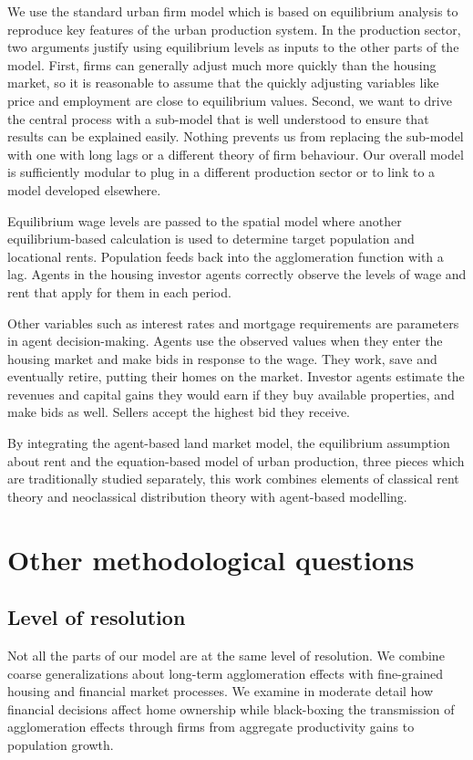 We use the standard urban firm model which is based on equilibrium analysis to reproduce key features of the urban production system. In the production sector, two arguments justify using equilibrium levels as inputs to the other parts of the model. First, firms can generally adjust much more quickly than the housing market, so it is reasonable to assume that the quickly adjusting variables like price and employment are close to equilibrium values.  Second, we want to drive the central process with a sub-model that is well understood to ensure that results can be explained easily. Nothing prevents us from replacing the sub-model with one with long lags or a different theory of firm behaviour. Our overall model is sufficiently modular to plug in a different production sector or to link to a model developed elsewhere.

Equilibrium wage levels are passed to the spatial model where another equilibrium-based calculation is used to determine target population and locational rents. Population feeds back into the agglomeration function with a lag. Agents in the housing investor agents correctly observe the levels of wage and rent that apply for them in each period. 

Other variables such as interest rates and mortgage requirements are parameters in agent decision-making. Agents use the observed values when they enter the housing market and make bids in response to the wage. They work, save and eventually retire, putting their homes on the market. Investor agents estimate the revenues and capital gains they would earn if they buy available properties, and make bids as well. Sellers accept the highest bid they receive. 

By integrating the agent-based land market model, the equilibrium assumption about rent and the equation-based model of urban production, three pieces which are traditionally studied separately, this work combines elements of classical rent theory and neoclassical distribution theory with agent-based modelling.



\section{Other methodological questions}\label{sec-other}
\subsection{Level of resolution}
Not all the parts of our model are at the same level of resolution. We combine coarse generalizations about long-term agglomeration effects with fine-grained housing and financial market processes. We examine in moderate detail how financial decisions affect home ownership while black-boxing the transmission of agglomeration effects through firms from aggregate productivity gains to population growth. 

